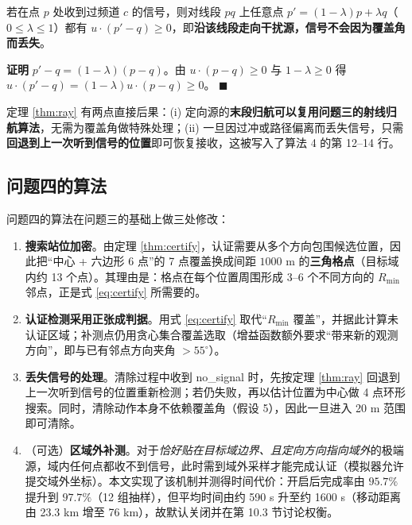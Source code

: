 \documentclass[withoutpreface,bwprint]{cumcmthesis}
\newenvironment{pf}{\par\noindent\textbf{证明}\quad}{\hfill$\blacksquare$\par}
\begin{document}
\begin{theorem}[射线逼近引理]\label{thm:ray}
若在点 $p$ 处收到过频道 $c$ 的信号，则对线段 $pq$ 上任意点 $p'=(1-\lambda)p+\lambda q$（$0\le\lambda\le1$）都有 $u\cdot(p'-q)\ge0$，即\textbf{沿该线段走向干扰源，信号不会因为覆盖角而丢失}。
\end{theorem}
\begin{pf}
$p'-q=(1-\lambda)(p-q)$。由 $u\cdot(p-q)\ge0$ 与 $1-\lambda\ge0$ 得 $u\cdot(p'-q)=(1-\lambda)u\cdot(p-q)\ge0$。
\end{pf}

定理 \ref{thm:ray} 有两点直接后果：(i) 定向源的\textbf{末段归航可以复用问题三的射线归航算法}，无需为覆盖角做特殊处理；(ii) 一旦因过冲或路径偏离而丢失信号，只需\textbf{回退到上一次听到信号的位置}即可恢复接收，这被写入了算法 4 的第 12--14 行。

\subsection{问题四的算法}

问题四的算法在问题三的基础上做三处修改：

\begin{enumerate}
  \item \textbf{搜索站位加密}。由定理 \ref{thm:certify}，认证需要从多个方向包围候选位置，因此把“中心 + 六边形 6 点”的 7 点覆盖换成间距 $1000$ m 的\textbf{三角格点}（目标域内约 13 个点）。其理由是：格点在每个位置周围形成 3--6 个不同方向的 $R_{\min}$ 邻点，正是式 \eqref{eq:certify} 所需要的。
  \item \textbf{认证检测采用正张成判据}。用式 \eqref{eq:certify} 取代“$R_{\min}$ 覆盖”，并据此计算未认证区域；补测点仍用贪心集合覆盖选取（增益函数额外要求“带来新的观测方向”，即与已有邻点方向夹角 $>55^{\circ}$）。
  \item \textbf{丢失信号的处理}。清除过程中收到 no\_signal 时，先按定理 \ref{thm:ray} 回退到上一次听到信号的位置重新检测；若仍失败，再以估计位置为中心做 4 点环形搜索。同时，清除动作本身不依赖覆盖角（假设 5），因此一旦进入 20 m 范围即可清除。
  \item （可选）\textbf{区域外补测}。对于\emph{恰好贴在目标域边界、且定向方向指向域外}的极端源，域内任何点都收不到信号，此时需到域外采样才能完成认证（模拟器允许提交域外坐标）。本文实现了该机制并测得时间代价：开启后完成率由 $95.7\%$ 提升到 $97.7\%$（12 组抽样），但平均时间由约 590 s 升至约 1600 s（移动距离由 23.3 km 增至 76 km），故默认关闭并在第 10.3 节讨论权衡。
\end{enumerate}
\end{document}
